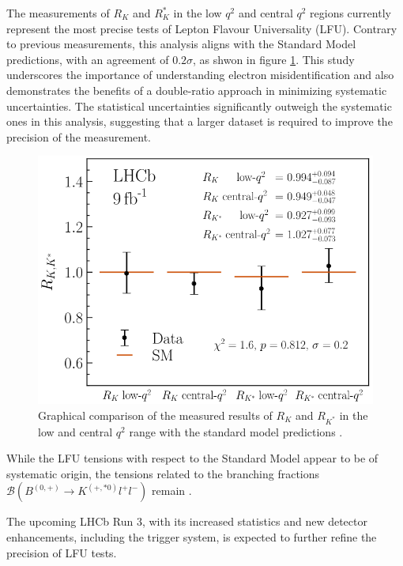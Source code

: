 The measurements of $R_K$ and $R_K^*$ in the low $q^2$ 
and central $q^2$ regions currently represent the most 
precise tests of Lepton Flavour Universality (LFU). 
Contrary to previous measurements, this analysis aligns 
with the Standard Model predictions, with an agreement of 
$\num{0.2}\sigma$, as shwon in figure \ref{fig:results}. 
This study underscores the importance of understanding 
electron misidentification and also demonstrates the 
benefits of a double-ratio approach in minimizing 
systematic uncertainties. The statistical uncertainties 
significantly outweigh the systematic ones in this 
analysis, suggesting that a larger dataset is required 
to improve the precision of the measurement.

\begin{figure}
    \centering
    \includegraphics[width=\linewidth]{figures/results.png}
    \caption{Graphical comparison of the measured results of $R_K$ and $R_{K^*}$ in the low and central $q^2$ range with the standard model predictions \cite{lhcbcollaboration2022measurement}.}
    \label{fig:results}
\end{figure}

While the LFU tensions with respect to the Standard Model 
appear to be of systematic origin, the tensions related to 
the branching fractions $\mathcal{B}(B^{(0,+)}\to K^{(+,*0)}l^+l^-)$ 
remain \cite{Branchingfraction}.

The upcoming LHCb Run 3, with its increased statistics and 
new detector enhancements, including the trigger system, is 
expected to further refine the precision of LFU tests.